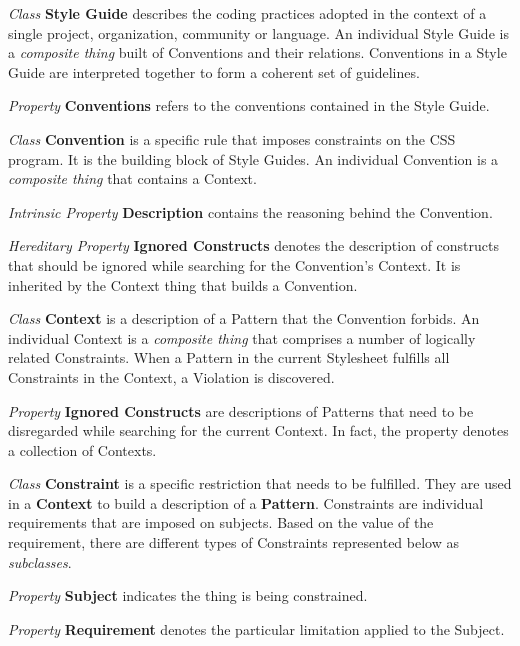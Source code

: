 \begin{description}

\item\textit{Class} \textbf{Style Guide} describes the coding practices
adopted  in the context of a single project, organization, community or
language. An individual Style Guide is a \textit{composite thing} built of
Conventions and their relations. Conventions in a Style Guide are interpreted
together to form a coherent set of guidelines.

\textit{Property} \textbf{Conventions} refers to the conventions contained in the Style Guide.


\item\textit{Class} \textbf{Convention} is a specific rule that imposes constraints on the CSS program. It is the building block of Style Guides. An individual Convention is a \textit{composite thing} that contains a Context.

\textit{Intrinsic Property} \textbf{Description} contains the reasoning behind the Convention.

\textit{Hereditary Property} \textbf{Ignored Constructs} denotes the description of constructs that should be ignored while searching for the Convention's Context. It is inherited by the Context thing that builds a Convention.


\item\textit{Class} \textbf{Context} is a description of a Pattern that the Convention forbids. An individual Context is a \textit{composite thing} that comprises a number of logically related Constraints. When a Pattern in the current Stylesheet fulfills all Constraints in the Context, a Violation is discovered.

\textit{Property} \textbf{Ignored Constructs} are descriptions of Patterns that need to be disregarded while searching for the current Context. In fact, the property denotes a collection of Contexts.


\item\textit{Class} \textbf{Constraint} is a specific restriction that needs to be fulfilled. They
are used in a \textbf{Context} to build a description of a \textbf{Pattern}. Constraints are
individual requirements that are imposed on subjects. Based on the value of the requirement, there
are different types of Constraints represented below as \textit{subclasses}.

\textit{Property} \textbf{Subject} indicates the thing is being constrained.

\textit{Property} \textbf{Requirement} denotes the particular limitation applied to the Subject.



\end{description}
